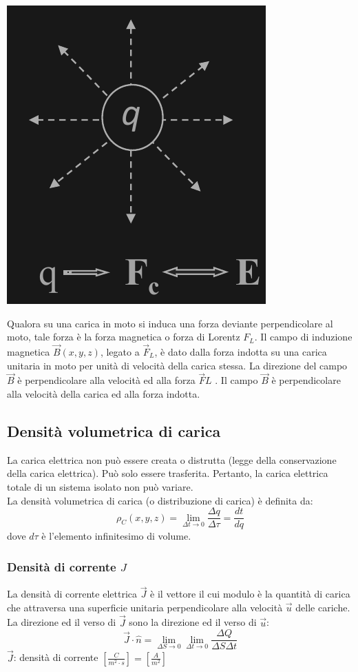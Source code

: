 \documentclass{article}
\begin{document}
\begin{center}
    \includegraphics[scale=0.27]{Image/Forza elettrostatica.png}
\end{center}
Qualora su una carica in moto si induca una forza
deviante perpendicolare al moto, tale forza è la
forza magnetica o forza di Lorentz 
$F_L$. Il campo
di induzione magnetica $\vec B(x,y,z)$, legato a $\vec F_L$, è
dato dalla forza indotta su una carica unitaria in
moto per unità di velocità della carica stessa. La
direzione del campo $\vec B$ è perpendicolare alla
velocità ed alla forza $\vec FL$ . Il campo $\vec B$ è
perpendicolare alla velocità della carica ed alla
forza indotta.

\subsection{Densità volumetrica di carica}
La carica elettrica non può essere creata o distrutta (legge della
conservazione della carica elettrica). Può solo essere trasferita. Pertanto, la
carica elettrica totale di un sistema isolato non può variare.\\
La densità volumetrica di carica (o distribuzione di carica) è definita da:
\[
    \rho_C (x,y,z) = \lim_{\Delta t \rightarrow 0} \frac{\Delta q}{\Delta \tau} = \frac{dt}{dq}  
\]
dove $d \tau$ è l'elemento infinitesimo di volume.

\subsubsection{Densità di corrente \texorpdfstring{$J$}{J}}
La densità di corrente elettrica $\vec J$ è il vettore il cui modulo è la quantità di
carica che attraversa una superficie unitaria perpendicolare alla velocità $\vec u$
delle cariche. La direzione ed il verso di $\vec J$ sono la direzione ed il verso di $\vec u$:
\[
    \vec J \cdot \hat n = \lim_{\Delta S \rightarrow 0} \lim_{\Delta t \rightarrow 0} \frac{\Delta Q}{\Delta S \Delta t}
\]
$\vec J$: densità di corrente $\left[\frac{C}{m^2\cdot s}\right] = \left[\frac{A}{m^2} \right]$
\end{document}
